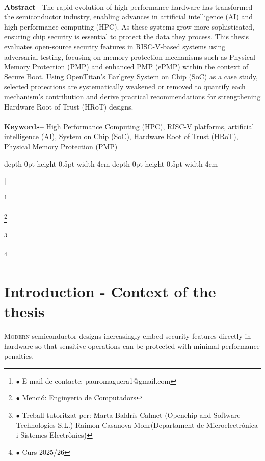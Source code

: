 \documentclass[10pt,a4paper,twocolumn,twoside]{article}
\newcommand\blfootnote[1]{%
  \begingroup
  \renewcommand\thefootnote{}\footnote{#1}%
  \addtocounter{footnote}{-1}%
  \endgroup
}
\begin{document}
\begin{@twocolumnfalse}
\begin{center}
{\bigskip
\\
\textbf{Abstract--} The rapid evolution of high-performance hardware has transformed the semiconductor industry, enabling advances in artificial intelligence (AI) and high-performance computing (HPC). As these systems grow more sophisticated, ensuring chip security is essential to protect the data they process. This thesis evaluates open-source security features in RISC-V-based systems using adversarial testing, focusing on memory protection mechanisms such as Physical Memory Protection (PMP) and enhanced PMP (ePMP) within the context of Secure Boot. Using OpenTitan's Earlgrey System on Chip (SoC) \cite{opentitan} \cite{meza2023} \cite{musa2024} as a case study, selected protections are systematically weakened or removed to quantify each mechanism's contribution and derive practical recommendations for strengthening Hardware Root of Trust (HRoT) designs.
\\
\\
\textbf{Keywords-- } High Performance Computing (HPC), RISC-V platforms, artificial intelligence (AI), System on Chip (SoC), Hardware Root of Trust (HRoT), Physical Memory Protection (PMP)
\\
}

\bigskip

{\vrule depth 0pt height 0.5pt width 4cm\hspace{7.5pt}%
%
\hspace{7.5pt}\vrule depth 0pt height 0.5pt width 4cm\relax}

\end{center}

\end{@twocolumnfalse}]

\blfootnote{$\bullet$ E-mail de contacte: pauromaguera1@gmail.com}
\blfootnote{$\bullet$ Menció: Enginyeria de Computadors}
\blfootnote{$\bullet$ Treball tutoritzat per: Marta Baldrís Calmet (Openchip and Software Technologies S.L.) Raimon Casanova Mohr(Departament de Microelectrònica i Sistemes Electrònics)}
\blfootnote{$\bullet$ Curs 2025/26}

\section{Introduction - Context of the thesis}
\setlength{\parindent}{1em}
\lettrine[lines=3]{M}{odern} semiconductor designs increasingly embed security features directly in hardware so that sensitive operations can be protected with minimal performance penalties.
\end{document}
